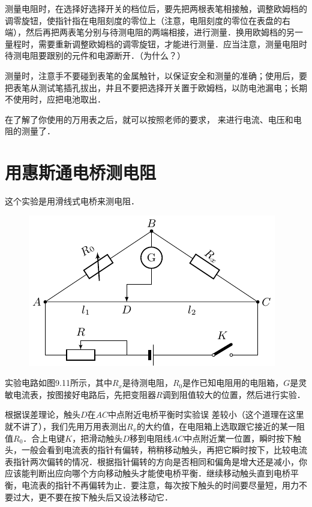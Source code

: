 测量电阻时，在选择好选择开关的档位后，要先把两根表笔相接触，调整欧姆档的调零旋钮，使指针指在电阻刻度的零位上（注意，电阻刻度的零位在表盘的右端），然后再把两表笔分别与待测电阻的两端相接，进行测量．换用欧姆档的另一量程时，需要重新调整欧姆档的调零旋钮，才能进行测量．应当注意，测量电阻时待测电阻要跟别的元件和电源断开．（为什么？）

测量时，注意手不要碰到表笔的金属触针，以保证安全和测量的准确；使用后，要把表笔从测试笔插孔拔出，井且不要把选择开关置于欧姆档，以防电池漏电；长期不使用时，应把电池取出．

在了解了你使用的万用表之后，就可以按照老师的要求，
来进行电流、电压和电阻的测量了．

\section{用惠斯通电桥测电阻}

这个实验是用滑线式电桥来测电阻．
\begin{figure}[htbp]
    \centering
    \includegraphics{fig/B/9-11.pdf}
    \caption{}\label{fig_B_9-11}
\end{figure}

实验电路如图9.11所示，其中$R_x$是待测电阻，$R_0$是作已知电阻用的电阻箱，$G$是灵敏电流表，按图接好电路后，先把变阻器$R$调到阻值较大的位置，然后进行实验．

根据误差理论，触头$D$在$AC$中点附近电桥平衡时实验误
差较小（这个道理在这里就不讲了），我们先用万用表测出$R_x$的大约值，在电阻箱上选取跟它接近的某一阻值$R_0$．合上电键$K$，把滑动触头$D$移到电阻线$AC$中点附近業一位置，瞬时按下触头，一般会看到电流表的指针有偏转，稍稍移动触头，再把它瞬时按下，比较电流表指针两次偏转的情况．根据指针偏转的方向是否相同和偏角是增大还是减小，你应该能判断出应向哪个方向移动触头才能使电桥平衡．继续移动触头直到电桥平衡，电流表的指针不再偏转为止．要注意，每次按下触头的时间要尽量短，用力不要过大，更不要在按下触头后又设法移动它．

